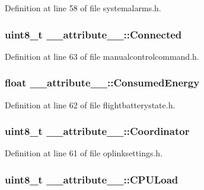 \-Definition at line 58 of file systemalarms.\-h.

\hypertarget{struct____attribute_____a45a88bd47ca3ee3449a1e0139d399568}{
\subsubsection[{\-Connected}]{\setlength{\rightskip}{0pt plus 5cm}uint8\-\_\-t {\bf \-\_\-\-\_\-attribute\-\_\-\-\_\-\-::\-Connected}}}\label{struct____attribute_____a45a88bd47ca3ee3449a1e0139d399568}


\-Definition at line 63 of file manualcontrolcommand.\-h.

\hypertarget{struct____attribute_____a212f767739033ba6edacdf3e54096b20}{
\subsubsection[{\-Consumed\-Energy}]{\setlength{\rightskip}{0pt plus 5cm}float {\bf \-\_\-\-\_\-attribute\-\_\-\-\_\-\-::\-Consumed\-Energy}}}\label{struct____attribute_____a212f767739033ba6edacdf3e54096b20}


\-Definition at line 62 of file flightbatterystate.\-h.

\hypertarget{struct____attribute_____ad330cf70033ead9ba80e4496abdf70b2}{
\subsubsection[{\-Coordinator}]{\setlength{\rightskip}{0pt plus 5cm}uint8\-\_\-t {\bf \-\_\-\-\_\-attribute\-\_\-\-\_\-\-::\-Coordinator}}}\label{struct____attribute_____ad330cf70033ead9ba80e4496abdf70b2}


\-Definition at line 61 of file oplinksettings.\-h.

\hypertarget{struct____attribute_____a33dc74413b722b5c165aa2d71a9a0c62}{
\subsubsection[{\-C\-P\-U\-Load}]{\setlength{\rightskip}{0pt plus 5cm}uint8\-\_\-t {\bf \-\_\-\-\_\-attribute\-\_\-\-\_\-\-::\-C\-P\-U\-Load}}}\label{struct____attribute_____a33dc74413b722b5c165aa2d71a9a0c62}


